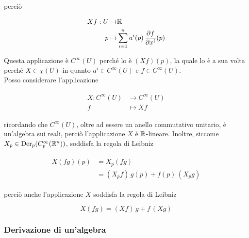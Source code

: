 perciò

\begin{align}
	\begin{split}
		X f : U \to& \mathbb{R}\\
		p \mapsto& \sum_{i=1}^{n} a^{i}(p) \, \dfrac{\partial f}{\partial x^{i}} (p)
	\end{split}
\end{align}

Questa applicazione è $ C^{\infty}(U) $ perché lo è $ (X f) (p) $, la quale lo è a sua volta perché $ X \in \chi(U) $ in quanto $ a^{i} \in C^{\infty}(U) $ e $ f \in C^{\infty}(U) $.\\
Posso considerare l'applicazione

\begin{align}
	\begin{split}
		X : C^{\infty}(U) &\to C^{\infty}(U)\\
		f &\mapsto X f
	\end{split}
\end{align}

ricordando che $ C^{\infty}(U) $, oltre ad essere un anello commutativo unitario, è un'algebra sui reali, perciò l'applicazione $ X $ è $ \mathbb{R} $-lineare. Inoltre, siccome $ X_{p} \in \operatorname{Der}_{p}(C_{p}^{\infty}(\mathbb{R}^{n})) $, soddisfa la regola di Leibniz

\begin{align}
	\begin{split}
		X (f g) (p) &= X_{p} (f g)\\
		&= (X_{p} f) \, g(p) + f(p) \, (X_{p} g) 
	\end{split}
\end{align}

perciò anche l'applicazione $ X $ soddisfa la regola di Leibniz

\begin{equation}
	X (f g) = (X f) \, g + f \, (X g)
\end{equation}

\subsubsection{Derivazione di un'algebra}

